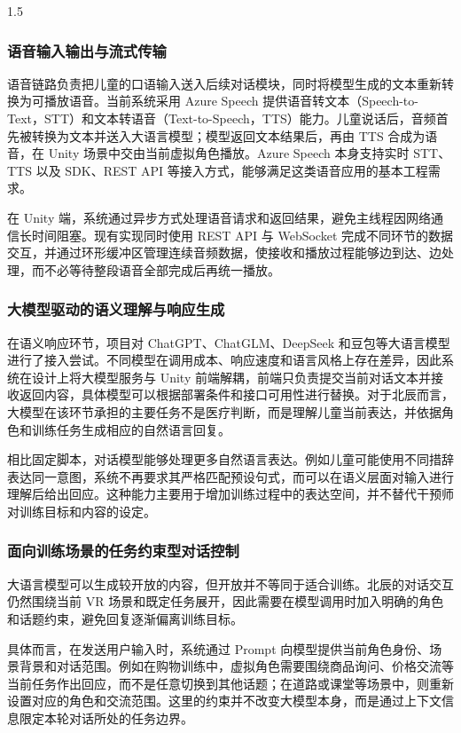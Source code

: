 \documentclass[zihao=-4]{ctexart}
\begin{document}
\begin{spacing}{1.5}
\subsubsection{语音输入输出与流式传输}

语音链路负责把儿童的口语输入送入后续对话模块，同时将模型生成的文本重新转换为可播放语音。当前系统采用 Azure Speech 提供语音转文本（Speech-to-Text，STT）和文本转语音（Text-to-Speech，TTS）能力。儿童说话后，音频首先被转换为文本并送入大语言模型；模型返回文本结果后，再由 TTS 合成为语音，在 Unity 场景中交由当前虚拟角色播放。Azure Speech 本身支持实时 STT、TTS 以及 SDK、REST API 等接入方式，能够满足这类语音应用的基本工程需求。

在 Unity 端，系统通过异步方式处理语音请求和返回结果，避免主线程因网络通信长时间阻塞。现有实现同时使用 REST API 与 WebSocket 完成不同环节的数据交互，并通过环形缓冲区管理连续音频数据，使接收和播放过程能够边到达、边处理，而不必等待整段语音全部完成后再统一播放。

\subsubsection{大模型驱动的语义理解与响应生成}

在语义响应环节，项目对 ChatGPT、ChatGLM、DeepSeek 和豆包等大语言模型进行了接入尝试。不同模型在调用成本、响应速度和语言风格上存在差异，因此系统在设计上将大模型服务与 Unity 前端解耦，前端只负责提交当前对话文本并接收返回内容，具体模型可以根据部署条件和接口可用性进行替换。对于北辰而言，大模型在该环节承担的主要任务不是医疗判断，而是理解儿童当前表达，并依据角色和训练任务生成相应的自然语言回复。

相比固定脚本，对话模型能够处理更多自然语言表达。例如儿童可能使用不同措辞表达同一意图，系统不再要求其严格匹配预设句式，而可以在语义层面对输入进行理解后给出回应。这种能力主要用于增加训练过程中的表达空间，并不替代干预师对训练目标和内容的设定。

\subsubsection{面向训练场景的任务约束型对话控制}

大语言模型可以生成较开放的内容，但开放并不等同于适合训练。北辰的对话交互仍然围绕当前 VR 场景和既定任务展开，因此需要在模型调用时加入明确的角色和话题约束，避免回复逐渐偏离训练目标。

具体而言，在发送用户输入时，系统通过 Prompt 向模型提供当前角色身份、场景背景和对话范围。例如在购物训练中，虚拟角色需要围绕商品询问、价格交流等当前任务作出回应，而不是任意切换到其他话题；在道路或课堂等场景中，则重新设置对应的角色和交流范围。这里的约束并不改变大模型本身，而是通过上下文信息限定本轮对话所处的任务边界。


\end{spacing}
\end{document}

